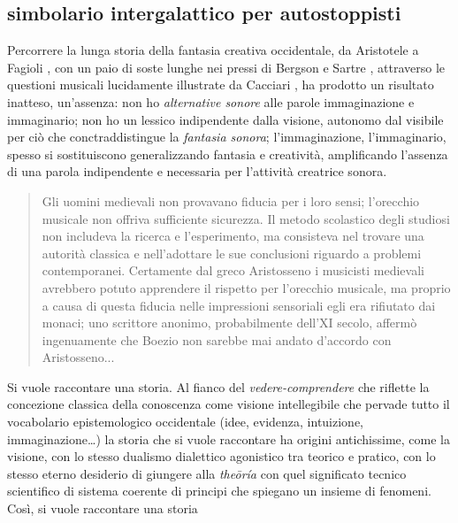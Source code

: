 \subsection{simbolario intergalattico per autostoppisti}

Percorrere la lunga storia della fantasia creativa occidentale, da Aristotele a
Fagioli \cite{mf:istinto}, con un paio di soste lunghe nei pressi di
Bergson \cite{bergson1896} e Sartre \cite{jps:immaginario}, attraverso le questioni
musicali lucidamente illustrate da Cacciari \cite{Cacciari1995}, ha prodotto un
risultato inatteso, un'assenza: non ho \emph{alternative sonore} alle parole
immaginazione e immaginario; non ho un lessico indipendente dalla visione,
autonomo dal visibile per ciò che conctraddistingue la \emph{fantasia sonora};
l'immaginazione, l'immaginario, spesso si sostituiscono generalizzando fantasia
e creatività, amplificando l'assenza di una parola indipendente e necessaria per
l'attività creatrice sonora.

\begin{quote}
\begin{sf}
\small
Gli uomini medievali non provavano fiducia per i loro sensi; l'orecchio musicale
non offriva sufficiente sicurezza. Il metodo scolastico degli studiosi non
includeva la ricerca e l'esperimento, ma consisteva nel trovare una autorità
classica e nell'adottare le sue conclusioni riguardo a problemi contemporanei.
Certamente dal greco Aristosseno i musicisti medievali avrebbero potuto
apprendere il rispetto per l'orecchio musicale, ma proprio a causa di questa
fiducia nelle impressioni sensoriali egli era rifiutato dai monaci; uno
scrittore anonimo, probabilmente dell'XI secolo, affermò ingenuamente che Boezio
non sarebbe mai andato d'accordo con Aristosseno... \cite{sachs1996}
\end{sf}
\end{quote}

Si vuole raccontare una storia. Al fianco del \emph{vedere-comprendere} che
riflette la concezione classica della conoscenza come visione intellegibile che
pervade tutto il vocabolario epistemologico occidentale (idee, evidenza,
intuizione, immaginazione\ldots) la storia che si vuole raccontare ha origini
antichissime, come la visione, con lo stesso dualismo dialettico agonistico tra
teorico e pratico, con lo stesso eterno desiderio di giungere alla \emph{theōría}
con quel significato tecnico scientifico di sistema coerente di principi che
spiegano un insieme di fenomeni. Così, si vuole raccontare una storia %

